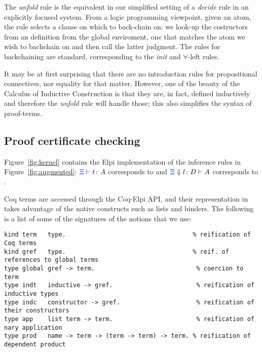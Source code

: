 The \emph{unfold} rule is the equivalent in our simplified setting of
a \emph{decide} rule in an explicitly focused system. From a logic
programming viewpoint, given an atom, the rule selects a clause on
which to back-chain on: we look-up the costructors from an
 definition from the global enviroment, one that
matches the atom we wish to bachchain on and then call the latter
judgment. The rules for backchaining are standard, corresponding to
the \emph{init} and $\forall$-left rules.

It may be at first surprising that there are no
introduction rules for propositional connectives, nor equality for
that matter. However, one of the beauty of the Calculus of Inductive
Construction is that they are, in fact,  defined inductively and
therefore the \emph{unfold} rule will handle those; this also
simplifies the syntax of proof-terms.

\subsection{Proof certificate checking}

Figure~\ref{fig:kernel} contains the Elpi implementation of the
inference rules in Figure~\ref{fig:augmented}: ${\color{blue}{\Xi}}\vdash t \colon A$ corresponds to
 and ${\color{blue}{\Xi}} \Downarrow  l \colon D\vdash A$ corresponds to
.


Coq terms are accessed through the Coq-Elpi API, and their representation
in \lP takes advantage of the native \lP constructs such as lists and binders.
The following is a list of some of the signatures of the notions that we use:
\begin{lstlisting}[language=lprolog]
kind term   type.                                   % reification of Coq terms
kind gref   type.                                   % reif. of references to global terms
type global gref -> term.                            % coercion to term
type indt   inductive -> gref.                       % reification of inductive types
type indc   constructor -> gref.                     % reification of their constructors 
type app    list term -> term.                       % reification of nary application
type prod   name -> term -> (term -> term) -> term. % reification of dependent product
\end{lstlisting}


